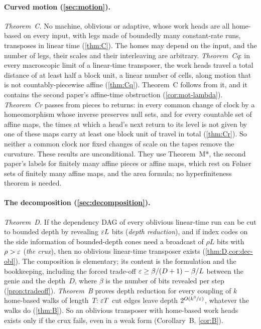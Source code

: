 \paragraph{Curved motion (\cref{sec:motion}).} \emph{Theorem~C.} No machine, oblivious or adaptive, whose work heads are
all home-based on every input, with legs made of boundedly many constant-rate runs, transposes in linear time
(\cref{thm:C}). The homes may depend on the input, and the number of legs, their scales and their interleaving are
arbitrary. \emph{Theorem~Cq}: in every macroscopic limit of a linear-time transposer, the work heads travel a total
distance of at least half a block unit, a linear number of cells, along motion that is not
countably-piecewise affine (\cref{thm:Cq}). Theorem~C follows from it, and it contains the second paper's affine-time
obstruction (\cref{cor:mot-lambda}). \emph{Theorem~Cr} passes from pieces to returns: in every common change of clock
by a homeomorphism whose inverse preserves null sets, and for every countable set of affine maps, the times at which a
head's next return to its level is not given by one of these maps carry at least one block unit of travel in total
(\cref{thm:Cr}). So neither a common clock nor fixed changes of scale on the tapes remove the
curvature. These results are unconditional. They use Theorem~M*, the second paper's labels for finitely many affine
pieces or affine maps, which rest on F\o lner sets of finitely many affine maps, and the area formula; no
hyperfiniteness theorem is needed.

\paragraph{The decomposition (\cref{sec:decomposition}).} \emph{Theorem~D.} If the dependency DAG of every oblivious
linear-time run can be cut to bounded depth by revealing $\varepsilon L$ bits (\emph{depth reduction}), and if index codes on the
side information of bounded-depth cones need a broadcast of $\rho L$ bits with $\rho>\varepsilon$ (\emph{the crux}), then no
oblivious linear-time transposer exists (\cref{thm:D,cor:dec-obl}). The composition is elementary; its content is the formulation and
the bookkeeping, including the forced trade-off $\varepsilon\ge\beta/(D+1)-\beta/L$ between the genie and the depth~$D$,
where $\beta$ is the number of bits revealed per step (\cref{prop:tradeoff}). \emph{Theorem~B} proves depth reduction for
every coupling of $k$ home-based walks of length~$T$: $\varepsilon T$ cut edges leave depth $2^{O(k^3/\varepsilon)}$, whatever the
walks do (\cref{thm:B}). So an oblivious transposer with home-based work heads
exists only if the crux fails, even in a weak form (Corollary~B, \cref{cor:B}).

